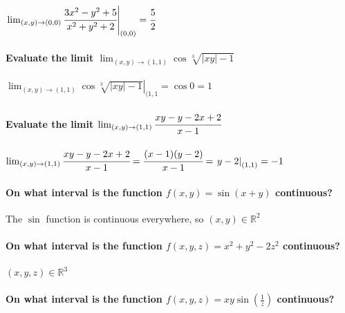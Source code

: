 \documentclass[
  letterpaper,
  DIV=11,
  numbers=noendperiod]{scrartcl}
\let\oldparagraph\paragraph
\renewcommand{\paragraph}[1]{\oldparagraph{#1}\mbox{}}
\begin{document}
\(\left.\lim_{(x, y) \rightarrow (0, 0)} \cfrac{3x^2-y^2+5}{x^2+y^2+2}\right\vert_{(0,0)} = \cfrac{5}{2}\)

\paragraph{\texorpdfstring{Evaluate the limit
\(\lim_{(x, y) \rightarrow (1, 1)} \cos\sqrt[3]{|xy|-1}\)}{Evaluate the limit \textbackslash lim\_\{(x, y) \textbackslash rightarrow (1, 1)\} \textbackslash cos\textbackslash sqrt{[}3{]}\{\textbar xy\textbar-1\}}}\label{evaluate-the-limit-lim_x-y-rightarrow-1-1-cossqrt3xy-1}

\(\left.\lim_{(x, y) \rightarrow (1, 1)} \cos\sqrt[3]{|xy|-1}\right\vert_{(1, 1} = \cos0 = 1\)

\paragraph{\texorpdfstring{Evaluate the limit
\(\lim_{(x, y) \rightarrow (1, 1)} \cfrac{xy-y-2x+2}{x-1}\)}{Evaluate the limit \textbackslash lim\_\{(x, y) \textbackslash rightarrow (1, 1)\} \textbackslash cfrac\{xy-y-2x+2\}\{x-1\}}}\label{evaluate-the-limit-lim_x-y-rightarrow-1-1-cfracxy-y-2x2x-1}

\(\lim_{(x, y) \rightarrow (1, 1)} \cfrac{xy-y-2x+2}{x-1}=\cfrac{(x-1)(y-2)}{x-1}=\left.y-2\right\vert_{(1,1)} = -1\)

\paragraph{\texorpdfstring{On what interval is the function
\(f(x, y) = \sin(x+y)\)
continuous?}{On what interval is the function f(x, y) = \textbackslash sin(x+y) continuous?}}\label{on-what-interval-is-the-function-fx-y-sinxy-continuous}

The \(\sin\) function is continuous everywhere, so
\((x, y) \in \mathbb{R}^2\)

\paragraph{\texorpdfstring{On what interval is the function
\(f(x, y, z) = x^2+y^2-2z^2\)
continuous?}{On what interval is the function f(x, y, z) = x\^{}2+y\^{}2-2z\^{}2 continuous?}}\label{on-what-interval-is-the-function-fx-y-z-x2y2-2z2-continuous}

\((x, y, z) \in \mathbb{R}^3\)

\paragraph{\texorpdfstring{On what interval is the function
\(f(x, y, z) = xy\sin\left(\frac{1}{z}\right)\)
continuous?}{On what interval is the function f(x, y, z) = xy\textbackslash sin\textbackslash left(\textbackslash frac\{1\}\{z\}\textbackslash right) continuous?}}\label{on-what-interval-is-the-function-fx-y-z-xysinleftfrac1zright-continuous}
\end{document}
